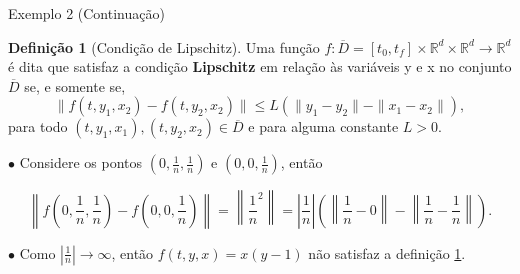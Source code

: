 \documentclass{beamer}
\newcommand{\R}{\mathbb{R}}
\theoremstyle{plain}
\theoremstyle{definition}
\newtheorem{defi}{Definição}
\begin{document}
\begin{frame}{Exemplo 2 (Continuação)}

    \small

        \begin{defi}[Condição de Lipschitz]
            \label{def:EDR:Lips}
            Uma função $f: \overline{D} = [t_0, t_f] \times \R^d \times \R^d \to \R^d $ é dita que satisfaz a condição \textbf{Lipschitz} em relação às variáveis y e x no conjunto $\overline{D}$ se, e somente se,
            \begin{equation}
                \| f(t, y_1, x_2) - f(t, y_2, x_2) \| \leq L (\| y_1 - y_2 \| - \|x_1 - x_2\|), 
                \label{chap1:def:eq:EDR_Lips}
            \end{equation}
            para todo $(t, y_1, x_1), (t, y_2, x_2) \in \overline{D}$ e para alguma constante $L>0$.
        \end{defi}


        $\bullet$ Considere os pontos $(0, \frac{1}{n}, \frac{1}{n})$ e $(0, 0, \frac{1}{n})$, então

        \noindent
        \footnotesize
        \[
            \left\| f\left(0, \frac{1}{n}, \frac{1}{n}\right) - f\left(0, 0, \frac{1}{n}\right) \right\| =  \left\|\frac{1}{n}^2 \right\| =  \left|\frac{1}{n}\right|\left( \left\|\frac{1}{n} - 0\right\| - \left\|\frac{1}{n} - \frac{1}{n} \right\| \right).
        \]

        \normalsize
        $\bullet$ Como $|\frac{1}{n}| \to \infty$, então $f(t, y, x) = x(y-1)$ não satisfaz a definição \ref{def:EDR:Lips}.
\end{frame}
\end{document}
